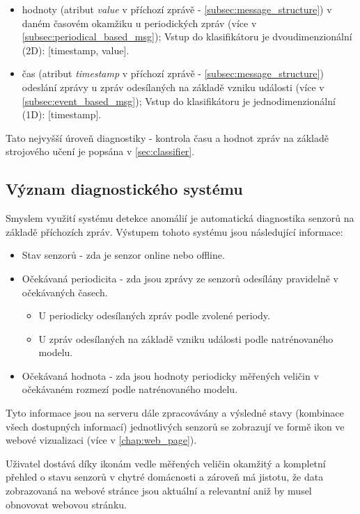 \begin{itemize}
	\item hodnoty (atribut \textit{value} v příchozí zprávě - \cref{subsec:message_structure}) v daném časovém okamžiku u periodických zpráv (více v \cref{subsec:periodical_based_msg}); Vstup do klasifikátoru je dvoudimenzionální (2D): [timestamp, value].
	\item čas (atribut \textit{timestamp} v příchozí zprávě - \cref{subsec:message_structure}) odeslání zprávy u zpráv odesílaných na základě vzniku události (více v \cref{subsec:event_based_msg}); Vstup do klasifikátoru je jednodimenzionální (1D): [timestamp].
\end{itemize}

Tato nejvyšší úroveň diagnostiky - kontrola času a hodnot zpráv na základě strojového učení je popsána v \cref{sec:classifier}. 

\subsection*{Význam diagnostického systému}
Smyslem využití systému detekce anomálií je automatická diagnostika senzorů na základě příchozích zpráv. Výstupem tohoto systému jsou následující informace:

\begin{itemize}
 	\item Stav senzorů - zda je senzor online nebo offline. 
	\item Očekávaná periodicita - zda jsou zprávy ze senzorů odesílány pravidelně v očekávaných časech.
	\begin{itemize}
		\item U periodicky odesílaných zpráv podle zvolené periody.
		\item U zpráv odesílaných na základě vzniku události podle natrénovaného modelu.
	\end{itemize}
	\item Očekávaná hodnota - zda jsou hodnoty periodicky měřených veličin v očekávaném rozmezí podle natrénovaného modelu.
\end{itemize}

Tyto informace jsou na serveru dále zpracovávány a výsledné stavy (kombinace všech dostupných informací) jednotlivých senzorů se zobrazují ve formě ikon ve webové vizualizaci (více v \cref{chap:web_page}). \par
Uživatel dostává díky ikonám vedle měřených veličin okamžitý a kompletní přehled o stavu senzorů v chytré domácnosti a zároveň má jistotu, že data zobrazovaná na webové stránce jsou aktuální a relevantní aniž by musel obnovovat webovou stránku.

